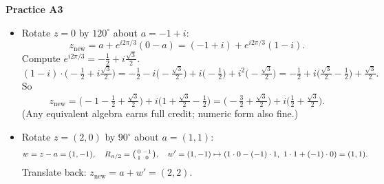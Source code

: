 \documentclass[11pt]{article}
\begin{document}
\textbf{Practice A3}
\begin{itemize}
  \item Rotate \(z=0\) by \(120^\circ\) about \(a=-1+i\):
  \[
  z_{\text{new}}=a+e^{i2\pi/3}(0-a)
  =(-1+i)+e^{i2\pi/3}(1-i).
  \]
  Compute \(e^{i2\pi/3}=-\tfrac12+i\tfrac{\sqrt3}{2}\).
  \[
  (1-i)\cdot\Big(-\tfrac12+i\tfrac{\sqrt3}{2}\Big)
  = -\tfrac12 - i\Big(-\tfrac{\sqrt3}{2}\Big) + i\Big(-\tfrac12\Big) + i^2\Big(-\tfrac{\sqrt3}{2}\Big)
  = -\tfrac12 + i\Big(\tfrac{\sqrt3}{2}-\tfrac12\Big) + \tfrac{\sqrt3}{2}.
  \]
  So
  \[
  z_{\text{new}}=\Big(-1-\tfrac12+\tfrac{\sqrt3}{2}\Big)
  + i\Big(1+\tfrac{\sqrt3}{2}-\tfrac12\Big)
  =\Big(-\tfrac{3}{2}+\tfrac{\sqrt3}{2}\Big)
  + i\Big(\tfrac{1}{2}+\tfrac{\sqrt3}{2}\Big).
  \]
  (Any equivalent algebra earns full credit; numeric form also fine.)
  \item Rotate \(z=(2,0)\) by \(90^\circ\) about \(a=(1,1)\):
  \[
  w=z-a=(1,-1),\quad
  R_{\pi/2}=\begin{psmallmatrix}0&-1\\[1pt]1&0\end{psmallmatrix},\quad
  w'=(1,-1)\mapsto(1\cdot 0-(-1)\cdot 1,\ 1\cdot 1+(-1)\cdot 0)=(1,1).
  \]
  Translate back: \(z_{\text{new}}=a+w'=(2,2)\).
\end{itemize}
\end{document}
